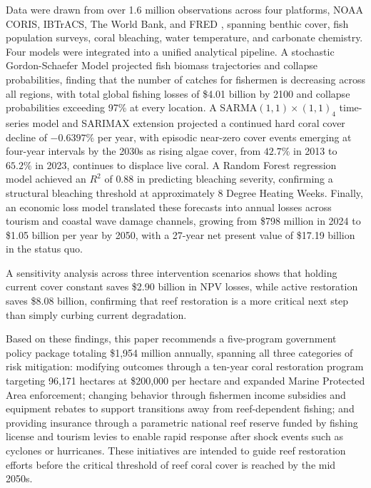 \documentclass[10pt,letterpaper]{article}
\newcounter{metric}
\newcounter{gs}
\begin{document}
Data were drawn from over 1.6 million observations across four platforms, NOAA CORIS, IBTrACS, The World Bank, and FRED \cite{noaa_coris, ibtracs, world_bank, fred}, spanning benthic cover, fish population surveys, coral bleaching, water temperature, and carbonate chemistry. Four models were integrated into a unified analytical pipeline. A stochastic Gordon-Schaefer Model projected fish biomass trajectories and collapse probabilities, finding that the number of catches for fishermen is decreasing across all regions, with total global fishing losses of \$4.01 billion by 2100 and collapse probabilities exceeding 97\% at every location. A SARMA$(1,1)\times(1,1)_4$ time-series model and SARIMAX extension projected a continued hard coral cover decline of $-0.6397\%$ per year, with episodic near-zero cover events emerging at four-year intervals by the 2030s as rising algae cover, from $42.7\%$ in 2013 to $65.2\%$ in 2023, continues to displace live coral. A Random Forest regression model achieved an $R^2$ of $0.88$ in predicting bleaching severity, confirming a structural bleaching threshold at approximately 8 Degree Heating Weeks. Finally, an economic loss model translated these forecasts into annual losses across tourism and coastal wave damage channels, growing from \$798 million in 2024 to \$1.05 billion per year by 2050, with a 27-year net present value of \$17.19 billion in the status quo.

A sensitivity analysis across three intervention scenarios shows that holding current cover constant saves \$2.90 billion in NPV losses, while active restoration saves \$8.08 billion, confirming that reef restoration is a more critical next step than simply curbing current degradation.

Based on these findings, this paper recommends a five-program government policy package totaling \$1,954 million annually, spanning all three categories of risk mitigation: modifying outcomes through a ten-year coral restoration program targeting 96,171 hectares at \$200,000 per hectare and expanded Marine Protected Area enforcement; changing behavior through fishermen income subsidies and equipment rebates to support transitions away from reef-dependent fishing; and providing insurance through a parametric national reef reserve funded by fishing license and tourism levies to enable rapid response after shock events such as cyclones or hurricanes. These initiatives are intended to guide reef restoration efforts before the critical threshold of reef coral cover is reached by the mid 2050s.
\end{document}
